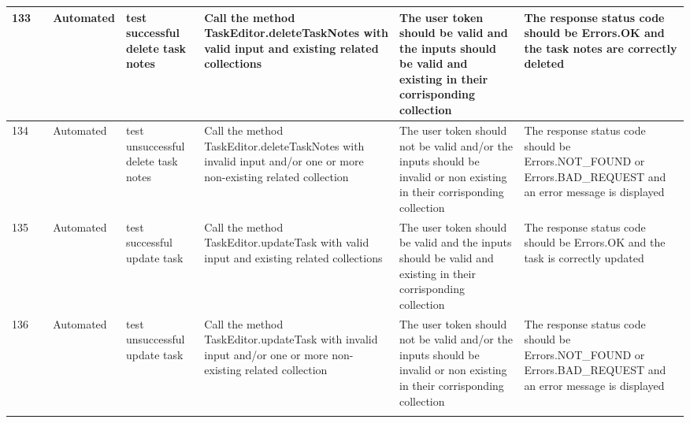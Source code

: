 \documentclass{article}
\begin{document}
{\begin{tabular}{|
    >{\columncolor[HTML]{FFFFFF}}l |
    >{\columncolor[HTML]{FFFFFF}}c |
    >{\columncolor[HTML]{FFFFFF}}l |l|l|l|l|}
    133                                 & \cellcolor[HTML]{FFFFFF}                                    & {\color[HTML]{11734B} Automated} & test successful delete task notes                   & Call the method TaskEditor.deleteTaskNotes with valid input and existing related collections                               & The user token should be valid and the inputs should be valid and existing in their corrisponding collection                                             & The response status code should be Errors.OK and the task notes are correctly deleted                         \\ \cline{1-1} \cline{3-7} 
    134                                 & \cellcolor[HTML]{FFFFFF}                                    & {\color[HTML]{11734B} Automated} & test unsuccessful delete task notes                 & Call the method TaskEditor.deleteTaskNotes with invalid input and/or one or more non-existing related collection           & The user token should not be valid and/or the inputs should be invalid or non existing in their corrisponding collection                                 & The response status code should be Errors.NOT\_FOUND or Errors.BAD\_REQUEST and an error message is displayed \\ \cline{1-1} \cline{3-7} 
    135                                 & \cellcolor[HTML]{FFFFFF}                                    & {\color[HTML]{11734B} Automated} & test successful update task                         & Call the method TaskEditor.updateTask with valid input and existing related collections                                    & The user token should be valid and the inputs should be valid and existing in their corrisponding collection                                             & The response status code should be Errors.OK and the task is correctly updated                                \\ \cline{1-1} \cline{3-7} 
    136                                 & \cellcolor[HTML]{FFFFFF}                                    & {\color[HTML]{11734B} Automated} & test unsuccessful update task                       & Call the method TaskEditor.updateTask with invalid input and/or one or more non-existing related collection                & The user token should not be valid and/or the inputs should be invalid or non existing in their corrisponding collection                                 & The response status code should be Errors.NOT\_FOUND or Errors.BAD\_REQUEST and an error message is displayed \\ \cline{1-1} \cline{3-7} 

\end{tabular}}
\end{document}

